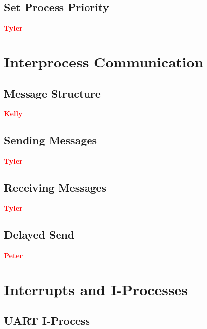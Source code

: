 \documentclass[12pt]{report}
\begin{document}
\subsection{Set Process Priority}

\textcolor{red}{\textbf{Tyler}} \\



\section{Interprocess Communication}

\subsection{Message Structure}

\textcolor{red}{\textbf{Kelly}} \\


\subsection{Sending Messages}

\textcolor{red}{\textbf{Tyler}} \\

\subsection{Receiving Messages}

\textcolor{red}{\textbf{Tyler}} \\

\subsection{Delayed Send}

\textcolor{red}{\textbf{Peter}} \\


\section{Interrupts and I-Processes}

\subsection{UART I-Process}
\end{document}
